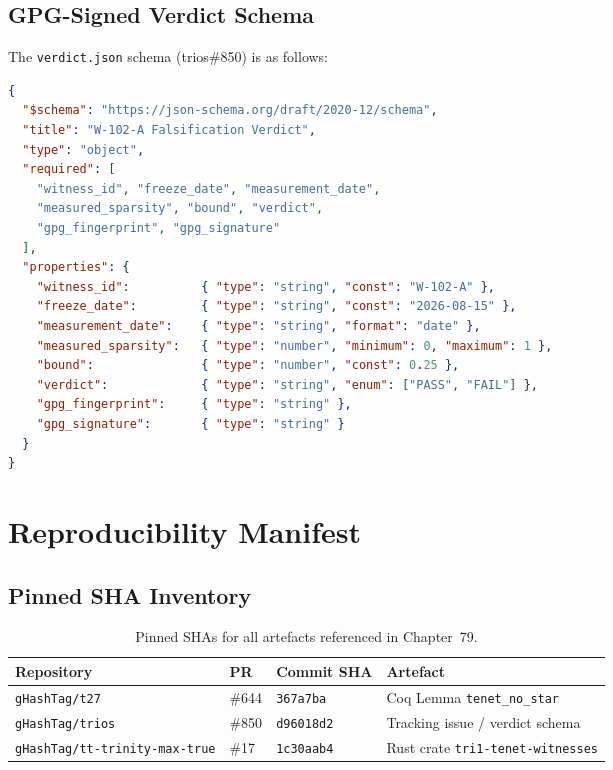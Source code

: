 \subsection{GPG-Signed Verdict Schema}
\label{subsec:ch79-verdict-schema}

The \texttt{verdict.json} schema (trios\#850) is as follows:

\begin{lstlisting}[language=json, caption={\texttt{verdict.json} schema
  for Witness W-102-A (trios\#850)}, label={lst:verdict-schema}]
{
  "$schema": "https://json-schema.org/draft/2020-12/schema",
  "title": "W-102-A Falsification Verdict",
  "type": "object",
  "required": [
    "witness_id", "freeze_date", "measurement_date",
    "measured_sparsity", "bound", "verdict",
    "gpg_fingerprint", "gpg_signature"
  ],
  "properties": {
    "witness_id":          { "type": "string", "const": "W-102-A" },
    "freeze_date":         { "type": "string", "const": "2026-08-15" },
    "measurement_date":    { "type": "string", "format": "date" },
    "measured_sparsity":   { "type": "number", "minimum": 0, "maximum": 1 },
    "bound":               { "type": "number", "const": 0.25 },
    "verdict":             { "type": "string", "enum": ["PASS", "FAIL"] },
    "gpg_fingerprint":     { "type": "string" },
    "gpg_signature":       { "type": "string" }
  }
}
\end{lstlisting}

\section{Reproducibility Manifest}
\label{sec:ch79-reproducibility}

\subsection{Pinned SHA Inventory}
\label{subsec:ch79-sha-inventory}

\begin{table}[htbp]
  \centering
  \caption{Pinned SHAs for all artefacts referenced in Chapter~79.}
  \label{tab:pinned-shas}
  \begin{tabular}{llll}
    \toprule
    \textbf{Repository}              & \textbf{PR} & \textbf{Commit SHA}  & \textbf{Artefact} \\
    \midrule
    \texttt{gHashTag/t27}            & \#644       & \texttt{367a7ba}     & Coq Lemma \texttt{tenet\_no\_star} \\
    \texttt{gHashTag/trios}          & \#850       & \texttt{d96018d2}    & Tracking issue / verdict schema \\
    \texttt{gHashTag/tt-trinity-max-true} & \#17  & \texttt{1c30aab4}    & Rust crate \texttt{tri1-tenet-witnesses} \\
    \bottomrule
  \end{tabular}
\end{table}

